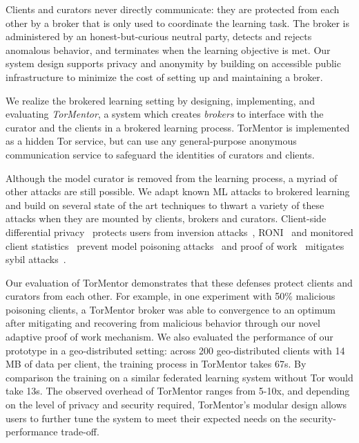 Clients and curators never directly communicate: they are protected
from each other by a broker that is only used to coordinate the
learning task. The broker is administered by an honest-but-curious
neutral party, detects and rejects anomalous behavior, and terminates
when the learning objective is met. Our system design supports privacy
and anonymity by building on accessible public infrastructure to
minimize the cost of setting up and maintaining a broker.

We realize the brokered learning setting by designing, implementing,
and evaluating \emph{TorMentor}, a system which creates \emph{brokers}
to interface with the curator and the clients
in a brokered learning process. TorMentor is
implemented as a hidden Tor service, but can use any general-purpose
anonymous communication service to safeguard the identities of
curators and clients. %


Although the model curator is removed from the learning process, a
myriad of other attacks are still possible. We adapt known ML attacks
to brokered learning and build on several state of the art techniques
to thwart a variety of these attacks when they are mounted by clients,
brokers and curators. Client-side differential
privacy~\cite{Dwork:2014, Geyer:2017} protects users from inversion
attacks~\cite{Fredrikson:2014, Fredrikson:2015}, 
\ac{RONI}~\cite{Barreno:2010} and monitored client
statistics~\cite{Mozaffari-Kermani:2015} prevent model poisoning
attacks~\cite{Biggio:2012, Huang:2011} and proof of
work~\cite{Back:2002} mitigates sybil attacks~\cite{Douceur:2002}.

Our evaluation of TorMentor demonstrates that these defenses protect
clients and curators from each other. For example, in one experiment
with 50\% malicious poisoning clients, a TorMentor broker was able to
convergence to an optimum after mitigating and recovering from 
malicious behavior through our novel adaptive proof of work mechanism.
We also evaluated the performance of our prototype in a geo-distributed
setting: across 200 geo-distributed clients with 14 MB of data
per client, the training process in TorMentor takes 67s. By
comparison the training on a similar federated learning system without
Tor would take 13s. The observed overhead of TorMentor ranges from
5-10x, and depending on the level of privacy and security required,
TorMentor's modular design allows users to further tune the system to
meet their expected needs on the security-performance trade-off.

